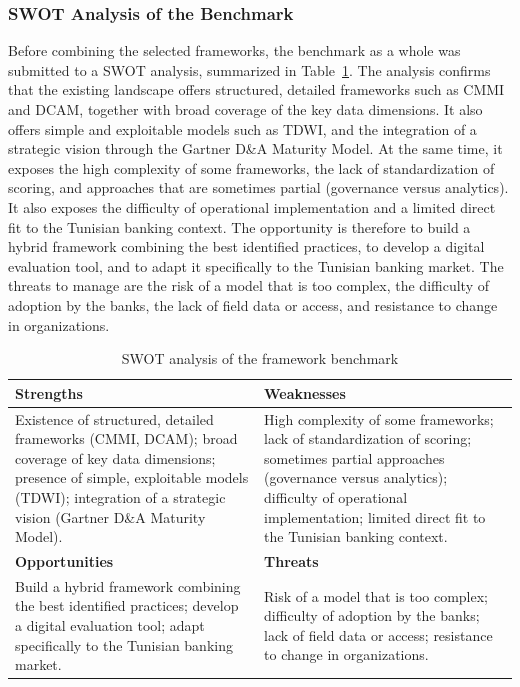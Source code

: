\subsubsection{SWOT Analysis of the Benchmark}

Before combining the selected frameworks, the benchmark as a whole was submitted to a SWOT analysis, summarized in Table~\ref{tab:benchmark-swot}. The analysis confirms that the existing landscape offers structured, detailed frameworks such as CMMI and DCAM, together with broad coverage of the key data dimensions. It also offers simple and exploitable models such as TDWI, and the integration of a strategic vision through the Gartner D\&A Maturity Model. At the same time, it exposes the high complexity of some frameworks, the lack of standardization of scoring, and approaches that are sometimes partial (governance versus analytics). It also exposes the difficulty of operational implementation and a limited direct fit to the Tunisian banking context. The opportunity is therefore to build a hybrid framework combining the best identified practices, to develop a digital evaluation tool, and to adapt it specifically to the Tunisian banking market. The threats to manage are the risk of a model that is too complex, the difficulty of adoption by the banks, the lack of field data or access, and resistance to change in organizations.

\begin{table}[H]
\centering
\caption{SWOT analysis of the framework benchmark} \label{tab:benchmark-swot}

{\footnotesize
\setlength{\tabcolsep}{4pt}
\begin{tabular}{|p{7.4cm}|p{7.4cm}|}
\hline
\textbf{Strengths} & \textbf{Weaknesses} \\
\hline
Existence of structured, detailed frameworks (CMMI, DCAM); broad coverage of key data dimensions; presence of simple, exploitable models (TDWI); integration of a strategic vision (Gartner D\&A Maturity Model). &
High complexity of some frameworks; lack of standardization of scoring; sometimes partial approaches (governance versus analytics); difficulty of operational implementation; limited direct fit to the Tunisian banking context. \\
\hline
\textbf{Opportunities} & \textbf{Threats} \\
\hline
Build a hybrid framework combining the best identified practices; develop a digital evaluation tool; adapt specifically to the Tunisian banking market. &
Risk of a model that is too complex; difficulty of adoption by the banks; lack of field data or access; resistance to change in organizations. \\
\hline
\end{tabular}
}

\end{table}

